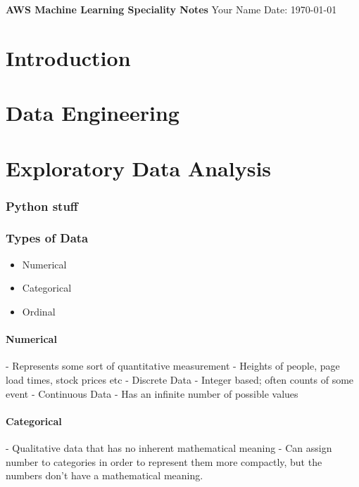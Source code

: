 \documentclass[11pt]{book}
\begin{document}
    \begin{titlepage}
        \centering
        \vspace*{2in}
        \Huge \textbf{AWS Machine Learning Speciality Notes}
        \vfill
        \Large Your Name
        \vfill
        \Large Date: \today
    \end{titlepage}

    \newpage

    \tableofcontents
    \newpage


    \chapter{Introduction}


    \chapter{Data Engineering}


    \chapter{Exploratory Data Analysis}

    \subsection{Python stuff}

    \subsection{Types of Data}

    \begin{itemize}
        \item Numerical
        \item Categorical
        \item Ordinal
    \end{itemize}

    \subsubsection{Numerical}
    - Represents some sort of quantitative measurement - Heights of people, page load times, stock prices etc
    - Discrete Data - Integer based; often counts of some event
    - Continuous Data - Has an infinite number of possible values

    \subsubsection{Categorical}
    - Qualitative data that has no inherent mathematical meaning
    - Can assign number to categories in order to represent them more compactly, but the numbers don't have a mathematical meaning.
\end{document}
